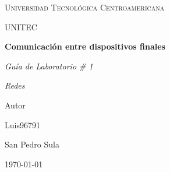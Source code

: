 
\begin{titlepage}
    \centering
    {\scshape\LARGE Universidad Tecnol\'ogica Centroamericana \par}
    \vspace{0.5cm}
    {\scshape\LARGE UNITEC \par}
    \vspace{2cm}

    {\huge\bfseries Comunicaci\'on entre dispositivos finales\par}
    \vspace{1cm}
    {\Large\itshape Gu\'ia de Laboratorio \# 1\par}
    \vspace{1cm}
    {\Large\itshape Redes\par}
	\vspace{3cm}
    
    Autor\par
	Luis96791
    \vspace{6cm}
    
    {San Pedro Sula \par}
    \vspace{0.5cm}
    
    {\large \today\par}
\end{titlepage}
